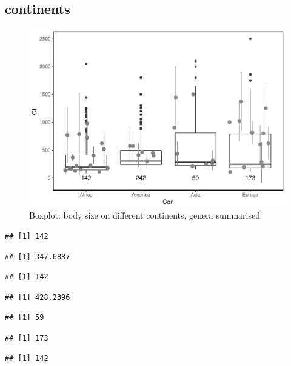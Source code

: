 \documentclass[]{article}
\begin{document}
\newpage

\subsection{continents}\label{continents-1}

\begin{figure}[htbp]
\centering
\includegraphics{MA_JJ_files/figure-latex/BPCon-1.pdf}
\caption{Boxplot: body size on different continents, genera summarised}
\end{figure}

\begin{verbatim}
## [1] 142
\end{verbatim}

\begin{verbatim}
## [1] 347.6887
\end{verbatim}

\begin{verbatim}
## [1] 142
\end{verbatim}

\begin{verbatim}
## [1] 428.2396
\end{verbatim}

\begin{verbatim}
## [1] 59
\end{verbatim}

\begin{verbatim}
## [1] 173
\end{verbatim}

\begin{verbatim}
## [1] 142
\end{verbatim}
\end{document}
